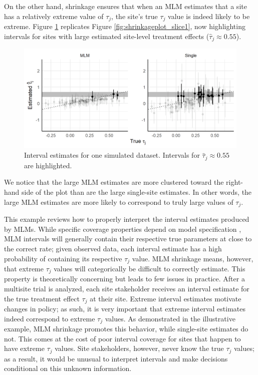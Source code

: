 \documentclass[]{article}
\begin{document}
On the other hand, shrinkage ensures that when an MLM estimates that a site has a relatively extreme value of $\tau_j$, the site's true $\tau_j$ value is indeed likely to be extreme.
Figure \ref{fig:shrinkageplot_slice3} replicates Figure \ref{fig:shrinkageplot_slice1}, now highlighting intervals for sites with large estimated site-level treatment effects ($\hat{\tau}_j \approx 0.55$).
\begin{figure}[h]
	\centering
	\includegraphics[width=\textwidth]{shrinkageplot_slice3}
	\caption{Interval estimates for one simulated dataset. Intervals for $\hat{\tau}_j \approx 0.55$ are highlighted.}
	\label{fig:shrinkageplot_slice3}
\end{figure}
We notice that the large MLM estimates are more clustered toward the right-hand side of the plot than are the large single-site estimates.
In other words, the large MLM estimates are more likely to correspond to truly large values of $\tau_j$.

This example reviews how to properly interpret the interval estimates produced by MLMs.
While specific coverage properties depend on model specification \citep{armstrong2020robust}, MLM intervals will generally contain their respective true parameters at close to the correct rate; given observed data, each interval estimate has a high probability of containing its respective $\tau_j$ value.
MLM shrinkage means, however, that extreme $\tau_j$ values will categorically be difficult to correctly estimate.
This property is theoretically concerning but leads to few issues in practice.
After a multisite trial is analyzed, each site stakeholder receives an interval estimate for the true treatment effect $\tau_j$ at their site.
Extreme interval estimates motivate changes in policy; as such, it is very important that extreme interval estimates indeed correspond to extreme $\tau_j$ values.
As demonstrated in the illustrative example, MLM shrinkage promotes this behavior, while single-site estimates do not.
This comes at the cost of poor interval coverage for sites that happen to have extreme $\tau_j$ values.
Site stakeholders, however, never know the true $\tau_j$ values; as a result, it would be unusual to interpret intervals and make decisions conditional on this unknown information.
\end{document}
